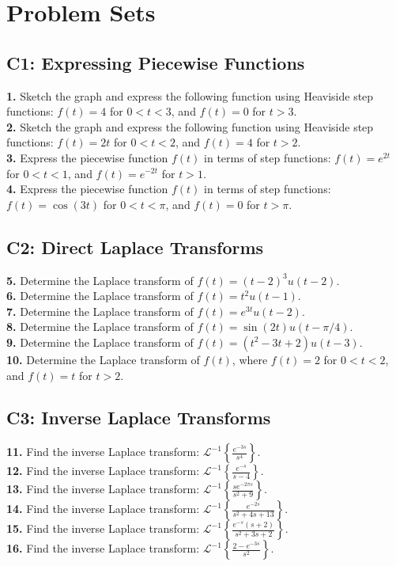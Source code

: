 \documentclass[11pt, letterpaper]{article}
\theoremstyle{definition}
\theoremstyle{remark}
\newcommand{\Lap}{\mathcal{L}}
\begin{document}
\newpage

\section{Problem Sets}

\subsection{C1: Expressing Piecewise Functions}
\textbf{1.} Sketch the graph and express the following function using Heaviside step functions: $f(t) = 4$ for $0 < t < 3$, and $f(t) = 0$ for $t > 3$. \\
\textbf{2.} Sketch the graph and express the following function using Heaviside step functions: $f(t) = 2t$ for $0 < t < 2$, and $f(t) = 4$ for $t > 2$. \\
\textbf{3.} Express the piecewise function $f(t)$ in terms of step functions: $f(t) = e^{2t}$ for $0 < t < 1$, and $f(t) = e^{-2t}$ for $t > 1$. \\
\textbf{4.} Express the piecewise function $f(t)$ in terms of step functions: $f(t) = \cos(3t)$ for $0 < t < \pi$, and $f(t) = 0$ for $t > \pi$.

\subsection{C2: Direct Laplace Transforms}
\textbf{5.} Determine the Laplace transform of $f(t) = (t-2)^3 u(t-2)$. \\
\textbf{6.} Determine the Laplace transform of $f(t) = t^2 u(t-1)$. \\
\textbf{7.} Determine the Laplace transform of $f(t) = e^{3t} u(t-2)$. \\
\textbf{8.} Determine the Laplace transform of $f(t) = \sin(2t) u(t-\pi/4)$. \\
\textbf{9.} Determine the Laplace transform of $f(t) = (t^2 - 3t + 2) u(t-3)$. \\
\textbf{10.} Determine the Laplace transform of $f(t)$, where $f(t) = 2$ for $0 < t < 2$, and $f(t) = t$ for $t > 2$.

\subsection{C3: Inverse Laplace Transforms}
\textbf{11.} Find the inverse Laplace transform: $\Lap^{-1} \left\{ \frac{e^{-3s}}{s^4} \right\}$. \\
\textbf{12.} Find the inverse Laplace transform: $\Lap^{-1} \left\{ \frac{e^{-s}}{s-4} \right\}$. \\
\textbf{13.} Find the inverse Laplace transform: $\Lap^{-1} \left\{ \frac{s e^{-2\pi s}}{s^2 + 9} \right\}$. \\
\textbf{14.} Find the inverse Laplace transform: $\Lap^{-1} \left\{ \frac{e^{-2s}}{s^2 + 4s + 13} \right\}$. \\
\textbf{15.} Find the inverse Laplace transform: $\Lap^{-1} \left\{ \frac{e^{-s}(s+2)}{s^2 + 3s + 2} \right\}$. \\
\textbf{16.} Find the inverse Laplace transform: $\Lap^{-1} \left\{ \frac{2 - e^{-3s}}{s^2} \right\}$.
\end{document}
